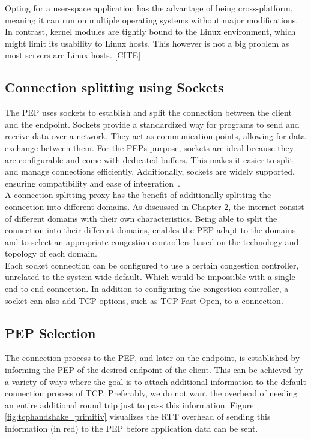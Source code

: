 \documentclass[a4paper,english, 11pt]{report}
\begin{document}
Opting for a user-space application has the advantage of being cross-platform, meaning it can run on multiple operating systems without major modifications. In contrast, kernel modules are tightly bound to the Linux environment, which might limit its usability to Linux hosts. This however is not a big problem as most servers are Linux hosts. [CITE]

\subsection{Connection splitting using Sockets}%
The PEP uses sockets to establish and split the connection between the client and the endpoint. Sockets provide a standardized way for programs to send and receive data over a network. They act as communication points, allowing for data exchange between them. For the PEPs purpose, sockets are ideal because they are configurable and come with dedicated buffers. This makes it easier to split and manage connections efficiently. Additionally, sockets are widely supported, ensuring compatibility and ease of integration~\cite{ibm_doc}.\\

A connection splitting proxy has the benefit of additionally splitting the connection into different domains. As discussed in Chapter 2, the internet consist of different domains with their own characteristics. Being able to split the connection into their different domains, enables the PEP adapt to the domains and to select an appropriate congestion controllers based on the technology and topology of each domain.\\

Each socket connection can be configured to use a certain congestion controller, unrelated to the system wide default. Which would be impossible with a single end to end connection. In addition to configuring the congestion controller, a socket can also add TCP options, such as TCP Fast Open, to a connection.

\subsection{PEP Selection}
The connection process to the PEP, and later on the endpoint, is established by informing the PEP of the desired endpoint of the client. This can be achieved by a variety of ways where the goal is to attach additional information to the default connection process of TCP. Preferably, we do not want the overhead of needing an entire additional round trip just to pass this information. Figure \ref{fig:tcphandshake_primitiv} visualizes the RTT overhead of sending this information (in red) to the PEP before application data can be sent.\\
\end{document}
